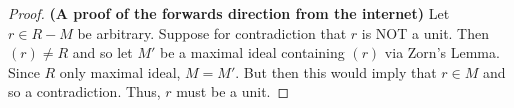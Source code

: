 \documentclass[a4paper]{article}
\begin{document}
\begin{proof}
    \textbf{(A proof of the forwards direction from the internet)} Let \( r \in R - M  \) be arbitrary. Suppose for contradiction that \( r \) is NOT a unit. Then \( (r) \neq R  \) and so let \( M' \) be a maximal ideal containing \( (r) \) via Zorn's Lemma. Since \( R  \) only maximal ideal, \( M= M' \). But then this would imply that \( r \in M  \) and so a contradiction. Thus, \( r  \) must be a unit. 
\end{proof}
\end{document}
